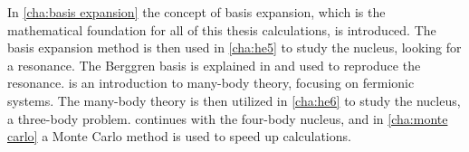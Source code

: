 \documentclass[../main/report.tex]{subfiles}
\begin{document}
In \cref{cha:basis expansion} the concept of 
basis expansion, which is the mathematical foundation for all of this thesis calculations, is introduced.
The basis expansion method is then used in 
\cref{cha:he5} to study the  nucleus, looking for a resonance.
The Berggren basis is explained in and used to reproduce the resonance.
 is an introduction to many-body theory, focusing 
on fermionic systems. The many-body theory is then utilized in \cref{cha:he6} 
to study the  nucleus, a three-body problem. 
continues with the four-body  nucleus, and in \cref{cha:monte carlo}
a Monte Carlo method is used to speed up calculations.
\end{document}
